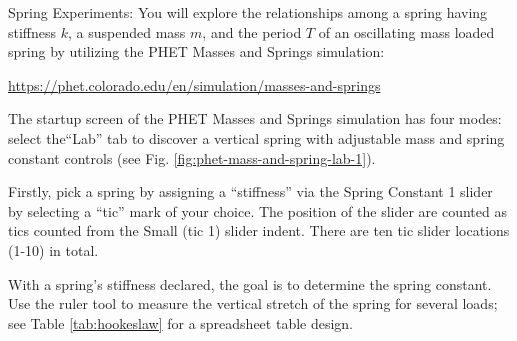 \documentclass[14pt]{article}
\newcommand{\subheading}[1]{{\boldtenrm #1}}
\begin{document}

\newpage 
\vphantom{}

\subheading{Spring Experiments:} You will explore the relationships among a spring having stiffness $k$, a suspended mass $m$, and the period $T$ of an oscillating mass loaded spring by utilizing the PHET Masses and Springs simulation: 
\vskip 0pt
\centerline{\url{https://phet.colorado.edu/en/simulation/masses-and-springs}}

\vskip -5pt
\begin{figure}
    \centering
    \label{fig:labicon}
\end{figure}


The startup screen of the PHET Masses and Springs simulation has four modes: select the``Lab'' tab to discover a vertical spring with adjustable mass and spring constant controls (see Fig. \ref{fig:phet-mass-and-spring-lab-1}). %

Firstly, pick a spring by assigning a ``stiffness'' via the Spring Constant 1 slider by selecting a ``tic'' mark of your choice.  The position of the slider are counted as tics counted from the Small (tic 1) slider indent. There are ten tic slider locations (1-10) in total. 

With a spring's stiffness declared, the goal is to determine the spring constant. Use the ruler tool to measure the vertical stretch of the spring for several loads; see Table \ref{tab:hookeslaw} for a spreadsheet table design. 

\end{document}
